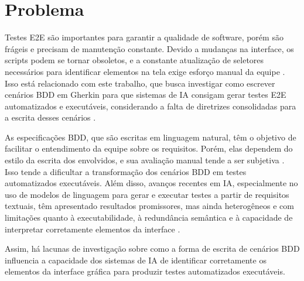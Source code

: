 \section{Problema}

Testes E2E são importantes para garantir a qualidade de software, porém são frágeis e precisam de manutenção constante. Devido a mudanças na interface, os scripts podem se tornar obsoletos, e a constante atualização de seletores necessários para identificar elementos na tela exige esforço manual da equipe \cite{Pysmennyi2025}. Isso está relacionado com este trabalho, que busca investigar como escrever cenários BDD em Gherkin para que sistemas de IA consigam gerar testes E2E automatizados e executáveis, considerando a falta de diretrizes consolidadas para a escrita desses cenários \cite{Oliveira2019}.

 As especificações BDD, que são escritas em linguagem natural, têm o objetivo de facilitar o entendimento da equipe sobre os requisitos. Porém, elas dependem do estilo da escrita dos envolvidos, e sua avaliação manual tende a ser subjetiva \cite{Alinezhadtilaki2025}. Isso tende a dificultar a transformação dos cenários BDD em testes automatizados executáveis.  Além disso, avanços recentes em IA, especialmente no uso de modelos de linguagem para gerar e executar testes a partir de requisitos textuais, têm apresentado resultados promissores, mas ainda heterogêneos e com limitações quanto à executabilidade, à redundância semântica e à capacidade de interpretar corretamente elementos da interface \cite{Pysmennyi2025}.

Assim, há lacunas de investigação sobre como a forma de escrita de cenários BDD influencia a capacidade dos sistemas de IA de identificar corretamente os elementos da interface gráfica para produzir testes automatizados executáveis.
